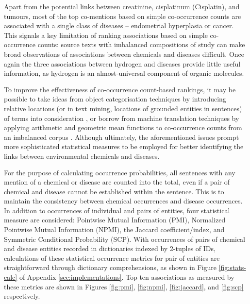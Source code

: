 \documentclass[10pt, oneside]{article}
\begin{document}
Apart from the potential links between creatinine, cisplatinum (Cisplatin), and tumours, most of the top co-mentions based on simple co-occurrence counts are associated with a single class of diseases -- endometrial hyperplasia or cancer. This signals a key limitation of ranking associations based on simple co-occurrence counts: source texts with imbalanced compositions of study can make broad observations of associations between chemicals and diseases difficult. Once again the three associations between hydrogen and diseases provide little useful information, as hydrogen is an almost-universal component of organic molecules. 

To improve the effectiveness of co-occurrence count-based rankings, it may be possible to take ideas from object categorisation techniques by introducing relative locations (or in text mining, locations of grounded entities in sentences) of terms into consideration \cite{galleguillos2008object}, or borrow from machine translation techniques by applying arithmetic and geometric mean functions to co-occurrence counts from an imbalanced corpus \cite{zhu2014improving}. Although ultimately, the aforementioned issues prompt more sophisticated statistical measures to be employed for better identifying the links between environmental chemicals and diseases.

For the purpose of calculating occurrence probabilities, all sentences with any mention of a chemical or disease are counted into the total, even if a pair of chemical and disease cannot be established within the sentence. This is to maintain the consistency between chemical occurrences and disease occurrences. In addition to occurrences of individual and pairs of entities, four statistical measure are considered: Pointwise Mutual Information (PMI), Normalized Pointwise Mutual Information (NPMI), the Jaccard coefficient/index, and Symmetric Conditional Probability (SCP). With occurrences of pairs of chemical and disease entities recorded in dictionaries indexed by 2-tuples of IDs, calculations of these statistical occurrence metrics for pair of entities are straightforward through dictionary comprehensions, as shown in Figure \ref{fig:stats-calc} of Appendix \ref{sec:implementations}. Top ten associations as measured by these metrics are shown in Figures \ref{fig:pmi}, \ref{fig:npmi}, \ref{fig:jaccard}, and \ref{fig:scp} respectively.
\end{document}

